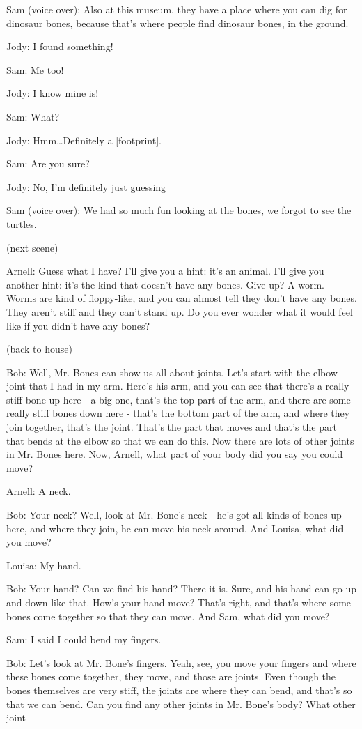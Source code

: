 Sam (voice over): Also at this museum, they have a place where you can dig for dinosaur bones, because that's where people find dinosaur bones, in the ground.

Jody: I found something!

Sam: Me too!

Jody: I know mine is!

Sam: What?

Jody: Hmm\dots Definitely a [footprint].

Sam: Are you sure?

Jody: No, I'm definitely just guessing

Sam (voice over): We had so much fun looking at the bones, we forgot to see the turtles.

(next scene)

Arnell: Guess what I have? I'll give you a hint: it's an animal. I'll give you another hint: it's the kind that doesn't have any bones. Give up? A worm. Worms are kind of floppy-like, and you can almost tell they don't have any bones. They aren't stiff and they can't stand up. Do you ever wonder what it would feel like if you didn't have any bones?

(back to house)

Bob: Well, Mr. Bones can show us all about joints. Let's start with the elbow joint that I had in my arm. Here's his arm, and you can see that there's a really stiff bone up here - a big one, that's the top part of the arm, and there are some really stiff bones down here - that's the bottom part of the arm, and where they join together, that's the joint. That's the part that moves and that's the part that bends at the elbow so that we can do this. Now there are lots of other joints in Mr. Bones here. Now, Arnell, what part of your body did you say you could move?

Arnell: A neck.

Bob: Your neck? Well, look at Mr. Bone's neck - he's got all kinds of bones up here, and where they join, he can move his neck around. And Louisa, what did you move?

Louisa: My hand.

Bob: Your hand? Can we find his hand? There it is. Sure, and his hand can go up and down like that. How's your hand move? That's right, and that's where some bones come together so that they can move. And Sam, what did you move?

Sam: I said I could bend my fingers.

Bob: Let's look at Mr. Bone's fingers. Yeah, see, you move your fingers and where these bones come together, they move, and those are joints. Even though the bones themselves are very stiff, the joints are where they can bend, and that's so that we can bend. Can you find any other joints in Mr. Bone's body? What other joint -

